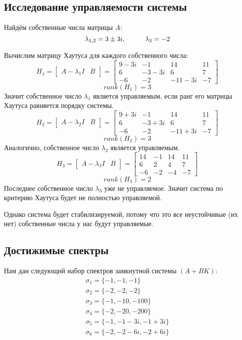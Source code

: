 \subsection{Исследование управляемости системы}

Найдём собственные числа матрицы $A$:
$$
    \lambda_{1,2} = 3 \pm 3i, \hspace*{1cm} \lambda_3 = -2
$$

Вычислим матрицу Хаутуса для каждого собственного числа:
$$
    H_1 = \begin{bmatrix}
          A - \lambda_1 I & B   
          \end{bmatrix} = 
    \begin{bmatrix}
    9-3i & -1 & 14 & 11 \\  
    6 & -3-3i & 6 & 7 \\  
    -6 & -2 & -11 -3i & -7   
    \end{bmatrix}
$$
$$
rank(H_1) = 3
$$
Значит собственное число $\lambda_1$ является управляемым, если ранг его матрицы Хаутуса равняется порядку системы.
$$
    H_2 = \begin{bmatrix}
          A - \lambda_2 I & B   
          \end{bmatrix} = 
    \begin{bmatrix}
      9+3i & -1 & 14 & 11 \\  
      6 & -3+3i & 6 & 7 \\  
      -6 & -2 & -11+3i & -7   
    \end{bmatrix}
$$
$$
rank(H_2) = 3
$$
Аналогично, собственное число $\lambda_2$ является управляемым.
$$
    H_3 = \begin{bmatrix}
          A - \lambda_3 I & B   
          \end{bmatrix} = 
    \begin{bmatrix}
      14 & -1 & 14 & 11 \\
      6 & 2 & 4 & 7 \\
      -6 & -2 & -4 & -7
    \end{bmatrix}
$$
$$
$$
$$
rank(H_3) = 2
$$
Последнее собственное число $\lambda_3$ уже не управляемое. Значит система по критерию Хаутуса будет не полностью управляемой. 

Однако система будет стабилизируемой, потому что это все неустойчивые (их нет) собственные числа у нас будут управляемые.

\subsection{Достижимые спектры}
Нам дан следующий набор спектров замкнутной системы $(A+BK)$:
$$
  \begin{aligned}
    \sigma_1 = \{-1, -1, -1\} \\
    \sigma_2 = \{-2, -2, -2\} \\
    \sigma_3 = \{-1, -10, -100\} \\
    \sigma_4 = \{-2, -20, -200\} \\
    \sigma_5 = \{-1, -1-3i, -1+3i\} \\
    \sigma_6 = \{-2, -2-6i, -2+6i\} 
  \end{aligned}
$$

